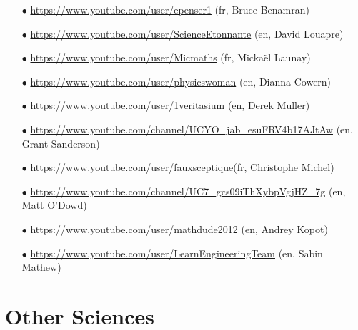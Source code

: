 	\begin{itemize}
		 \item[$\bullet$] \href{https://www.youtube.com/user/epenser1}{\color{blue}https://www.youtube.com/user/epenser1} (fr, Bruce Benamran)
		 
		 \item[$\bullet$] \href{https://www.youtube.com/user/ScienceEtonnante}{\color{blue}https://www.youtube.com/user/ScienceEtonnante} (en, David Louapre)
		 
		 \item[$\bullet$] \href{https://www.youtube.com/user/Micmaths}{\color{blue}https://www.youtube.com/user/Micmaths} (fr, Mickaël Launay)
		 
		 \item[$\bullet$]  \href{https://www.youtube.com/user/physicswoman}{\color{blue}https://www.youtube.com/user/physicswoman} (en, Dianna Cowern)
		 
		 \item[$\bullet$] \href{https://www.youtube.com/user/1veritasium}{\color{blue}https://www.youtube.com/user/1veritasium} (en, Derek Muller)
		 
		 \item[$\bullet$] \href{https://www.youtube.com/channel/UCYO_jab_esuFRV4b17AJtAw}{\color{blue}https://www.youtube.com/channel/UCYO\_jab\_esuFRV4b17AJtAw} (en, Grant Sanderson)
		 
		 \item[$\bullet$] \href{https://www.youtube.com/user/fauxsceptique}{\color{blue}https://www.youtube.com/user/fauxsceptique}(fr, Christophe Michel)
		 
		 \item[$\bullet$] \href{https://www.youtube.com/channel/UC7_gcs09iThXybpVgjHZ_7g}{\color{blue}https://www.youtube.com/channel/UC7\_gcs09iThXybpVgjHZ\_7g} (en, Matt O'Dowd)
		 
		 \item[$\bullet$] \href{https://www.youtube.com/user/mathdude2012}{\color{blue}https://www.youtube.com/user/mathdude2012} (en, Andrey Kopot)
		 
		 \item[$\bullet$] \href{https://www.youtube.com/user/LearnEngineeringTeam}{\color{blue}https://www.youtube.com/user/LearnEngineeringTeam} (en, Sabin Mathew)
	\end{itemize}

	\pagebreak
	\section{Other Sciences}
	
